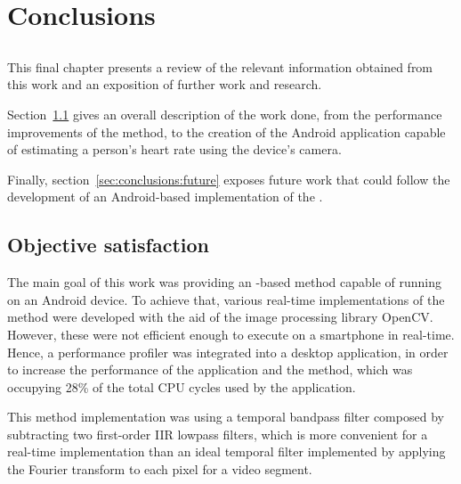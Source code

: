\chapter{Conclusions} \label{chap:conclusions}

\section*{}



This final chapter presents a review of the relevant information obtained
from this work and an exposition of further work and research.

Section~\ref{sec:conclusions:objectives} gives an overall description of
the work done, from the performance improvements of the \evm{} method,
to the creation of the Android application capable of estimating a
person's heart rate using the device's camera.

Finally, section~\ref{sec:conclusions:future} exposes future work that
could follow the development of an Android-based implementation
of the \evm{}.

\section{Objective satisfaction} \label{sec:conclusions:objectives}

The main goal of this work was providing an \evm{}-based method capable of
running on an Android device. To achieve that, various real-time
implementations of the \evm{} method were developed with the aid of the
image processing library OpenCV. However, these were
not efficient enough to execute on a smartphone in real-time. Hence,
a performance profiler was integrated into a desktop application, in order to
increase the performance of the application and the \evm{} method,
which was occupying 28\% of the total CPU cycles used by the application.

\pagebreak

This \evm{} method implementation was using a temporal bandpass filter composed
by subtracting two first-order IIR lowpass filters, which is more convenient
for a real-time implementation than an ideal temporal filter implemented by
applying the Fourier transform to each pixel for a video segment.

